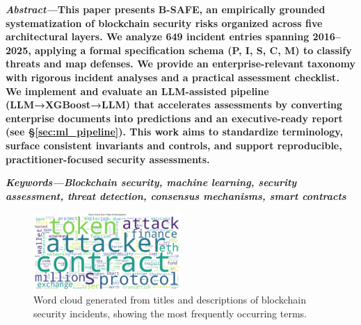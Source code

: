 \documentclass[a4paper]{article}
\begin{document}
\begin{multicols}{2}
\setlength{\columnsep}{0.5cm}


\noindent \textbf{\textit{Abstract---}This paper presents B-SAFE, an empirically grounded systematization of blockchain security risks organized across five architectural layers. We analyze 649 incident entries spanning 2016--2025, applying a formal specification schema (P, I, S, C, M) to classify threats and map defenses. We provide an enterprise-relevant taxonomy with rigorous incident analyses and a practical assessment checklist. We implement and evaluate an LLM-assisted pipeline (LLM→XGBoost→LLM) that accelerates assessments by converting enterprise documents into predictions and an executive-ready report (see \S\ref{sec:ml_pipeline}). This work aims to standardize terminology, surface consistent invariants and controls, and support reproducible, practitioner-focused security assessments.}

\small	
\noindent \textbf{\textit{Keywords---}\textit{Blockchain security, machine learning, security assessment, threat detection, consensus mechanisms, smart contracts}}

\begin{figure}[H]
\centering
\includegraphics[width=0.5\textwidth]{../figure/Figure/figures_2/F1_word_cloud.png}
\caption{Word cloud generated from titles and descriptions of blockchain security incidents, showing the most frequently occurring terms.}
\label{fig:word_cloud}
\end{figure}
















\end{multicols}
\end{document}
